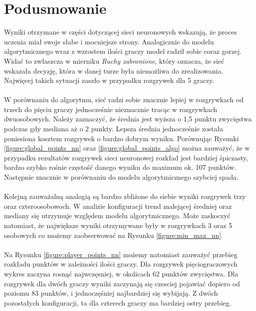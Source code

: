 \documentclass[12pt, oneside]{report}
\begin{document}
\section{Podusmowanie}
Wyniki otrzymane w części dotyczącej sieci neuronowych wskazują, że proces uczenia miał swoje słabe i mocniejsze strony. Analogicznie do modelu algorytmicznego wraz z wzrostem ilości graczy model radził sobie coraz gorzej. Widać to zwłaszcza w mierniku \textit{Ruchy zabronione}, który oznacza, że sieć wskazała decyzję, która w danej turze była niemożliwa do zrealizowania. Najwięcej takich sytuacji zaszło w przypadku rozgrywek dla 5 graczy. \\ \\
W porównaniu do algorytmu, sieć radzi sobie znacznie lepiej w rozgrywkach od trzech do pięciu graczy jednocześnie nieznacznie tracąc w rozgrywkach dwuosobowych. Należy zaznaczyć, że średnia jest wyższa o 1,5 punktu zwycięstwa podczas gdy mediana aż o 2 punkty. Lepsza średnia jednocześnie została poniesiona kosztem rozgrywek o bardzo dobrym wyniku. Porównując Rysunki \ref{figure:global_points_nn} oraz \ref{figure:global_points_algo} można zauważyć, że w przypadku rezultatów rozgrywek sieci neuronowej rozkład jest bardziej śpiczasty, bardzo szybko rośnie częstość danego wyniku do maximum ok. 107 punktów. Następnie znacznie w porównaniu do modelu algorytmicznego szybciej spada. \\ \\
Kolejną zauważalną analogią są bardzo zbliżone do siebie wyniki rozgrywek trzy oraz czteroosobowoch. W analizie konfiguracji trend malejącej średniej oraz mediany się utrzymuje względem modelu algorytmicznego. Może zaskoczyć natomiast, że największe wyniki otrzymywane były w rozgrywkach 3 oraz 5 osobowych co możemy zaobserwować na Rysunku \ref{figure:min_max_nn}. \\ \\
Na Rysunku \ref{figure:player_points_nn} możemy natomiast zauważyć przebieg rozkładu punktów w zależności ilości graczy. Dla rozgrywek pięciograczowych wykres zaczyna rosnąć najwczęsniej, w okolicach 62 punktów zwycięstwa. Dla rozgrywek dla dwóch graczy wyniki zaczynają się czesciej pojawiać dopiero od poziomu 83 punktów, i jednoczęśniej najbardziej się wybijają. Z dwóch pozostałych konfiguracji, ta dla czterech graczy ma bardziej ostry przebieg.
\end{document}
